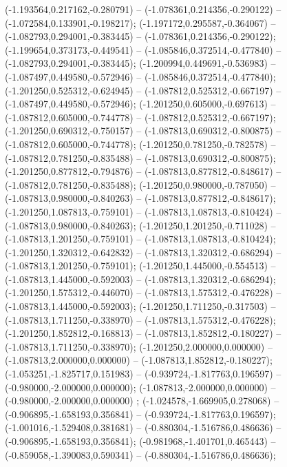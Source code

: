  (-1.193564,0.217162,-0.280791) -- (-1.078361,0.214356,-0.290122) -- (-1.072584,0.133901,-0.198217);
 (-1.197172,0.295587,-0.364067) -- (-1.082793,0.294001,-0.383445) -- (-1.078361,0.214356,-0.290122);
 (-1.199654,0.373173,-0.449541) -- (-1.085846,0.372514,-0.477840) -- (-1.082793,0.294001,-0.383445);
 (-1.200994,0.449691,-0.536983) -- (-1.087497,0.449580,-0.572946) -- (-1.085846,0.372514,-0.477840);
 (-1.201250,0.525312,-0.624945) -- (-1.087812,0.525312,-0.667197) -- (-1.087497,0.449580,-0.572946);
 (-1.201250,0.605000,-0.697613) -- (-1.087812,0.605000,-0.744778) -- (-1.087812,0.525312,-0.667197);
 (-1.201250,0.690312,-0.750157) -- (-1.087813,0.690312,-0.800875) -- (-1.087812,0.605000,-0.744778);
 (-1.201250,0.781250,-0.782578) -- (-1.087812,0.781250,-0.835488) -- (-1.087813,0.690312,-0.800875);
 (-1.201250,0.877812,-0.794876) -- (-1.087813,0.877812,-0.848617) -- (-1.087812,0.781250,-0.835488);
 (-1.201250,0.980000,-0.787050) -- (-1.087813,0.980000,-0.840263) -- (-1.087813,0.877812,-0.848617);
 (-1.201250,1.087813,-0.759101) -- (-1.087813,1.087813,-0.810424) -- (-1.087813,0.980000,-0.840263);
 (-1.201250,1.201250,-0.711028) -- (-1.087813,1.201250,-0.759101) -- (-1.087813,1.087813,-0.810424);
 (-1.201250,1.320312,-0.642832) -- (-1.087813,1.320312,-0.686294) -- (-1.087813,1.201250,-0.759101);
 (-1.201250,1.445000,-0.554513) -- (-1.087813,1.445000,-0.592003) -- (-1.087813,1.320312,-0.686294);
 (-1.201250,1.575312,-0.446070) -- (-1.087813,1.575312,-0.476228) -- (-1.087813,1.445000,-0.592003);
 (-1.201250,1.711250,-0.317503) -- (-1.087813,1.711250,-0.338970) -- (-1.087813,1.575312,-0.476228);
 (-1.201250,1.852812,-0.168813) -- (-1.087813,1.852812,-0.180227) -- (-1.087813,1.711250,-0.338970);
 (-1.201250,2.000000,0.000000) -- (-1.087813,2.000000,0.000000) -- (-1.087813,1.852812,-0.180227);
 (-1.053251,-1.825717,0.151983) -- (-0.939724,-1.817763,0.196597) -- (-0.980000,-2.000000,0.000000);
 (-1.087813,-2.000000,0.000000) -- (-0.980000,-2.000000,0.000000) ;
 (-1.024578,-1.669905,0.278068) -- (-0.906895,-1.658193,0.356841) -- (-0.939724,-1.817763,0.196597);
 (-1.001016,-1.529408,0.381681) -- (-0.880304,-1.516786,0.486636) -- (-0.906895,-1.658193,0.356841);
 (-0.981968,-1.401701,0.465443) -- (-0.859058,-1.390083,0.590341) -- (-0.880304,-1.516786,0.486636);
